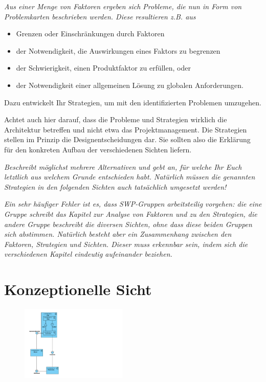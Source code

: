 \documentclass[fontsize=12pt,paper=a4,twoside]{scrartcl}
\begin{document}
{\it Aus einer Menge von Faktoren ergeben sich Probleme, die nun in
  Form von Problemkarten beschrieben werden. Diese resultieren
  z.B. aus
  \begin{itemize}
  \item Grenzen oder Einschränkungen durch Faktoren
  \item der Notwendigkeit, die Auswirkungen eines Faktors zu begrenzen
  \item der Schwierigkeit, einen Produktfaktor zu erfüllen, oder
  \item der Notwendigkeit einer allgemeinen Lösung zu globalen
    Anforderungen.
  \end{itemize}
  Dazu entwickelt Ihr Strategien, um mit den identifizierten Problemen
  umzugehen.

  Achtet auch hier darauf, dass die Probleme und Strategien wirklich
  die Architektur betreffen und nicht etwa das Projektmanagement. Die
  Strategien stellen im Prinzip die Designentscheidungen dar. Sie
  sollten also die Erklärung für den konkreten Aufbau der
  verschiedenen Sichten liefern.}


\textit{Beschreibt möglichst mehrere Alternativen und gebt
  an, für welche Ihr Euch letztlich aus welchem Grunde entschieden
  habt. Natürlich müssen die genannten Strategien in den folgenden
  Sichten auch tatsächlich umgesetzt werden!}

\textit{Ein sehr häufiger Fehler ist es, dass SWP-Gruppen
  arbeitsteilig vorgehen: die eine Gruppe schreibt das Kapitel zur
  Analyse von Faktoren und zu den Strategien, die andere Gruppe
  beschreibt die diversen Sichten, ohne dass diese beiden Gruppen sich
  abstimmen. Natürlich besteht aber ein Zusammenhang zwischen den
  Faktoren, Strategien und Sichten. Dieser muss erkennbar sein, indem
  sich die verschiedenen Kapitel eindeutig aufeinander beziehen.}

\section{Konzeptionelle Sicht}
\label{sec:konzeptionell}

\begin{figure}[H]
\centering
\includegraphics[width=0.45\textwidth]{konzeptsicht.pdf}
\end{figure}
\end{document}
